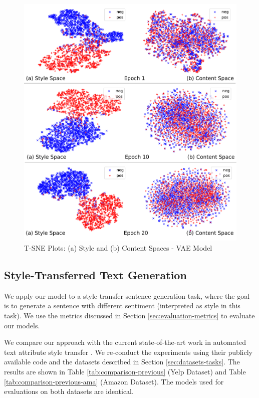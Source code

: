 \begin{figure}[ht]
	\includegraphics[width=\linewidth]{images/latent-spaces-vae}
	\caption{T-SNE Plots: (a) Style and (b) Content Spaces - VAE Model}
	\label{fig:vae-tsne}
\end{figure}

\subsection{Style-Transferred Text Generation}

We apply our model to a style-transfer sentence generation task, where the goal is to generate a sentence with different sentiment (interpreted as style in this task). We use the metrics discussed in Section \ref{sec:evaluation-metrics} to evaluate our models.

We compare our approach with the current state-of-the-art work in automated text attribute style transfer \citep{shen2017style,fu2017style}. We re-conduct the experiments using their publicly available code and the datasets described in Section \ref{sec:datasets-tasks}. The results are shown in Table \ref{tab:comparison-previous} (Yelp Dataset) and Table \ref{tab:comparison-previous-ama} (Amazon Dataset). The models used for evaluations on both datasets are identical.

